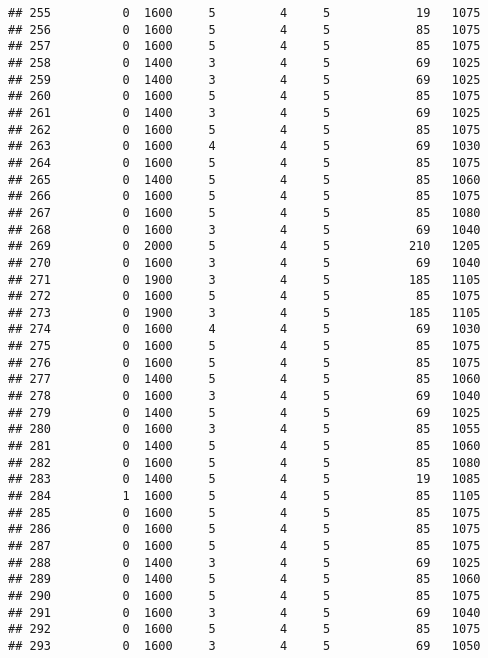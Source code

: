 \documentclass[]{article}
\begin{document}
\begin{verbatim}
## 255          0  1600     5         4     5            19   1075
## 256          0  1600     5         4     5            85   1075
## 257          0  1600     5         4     5            85   1075
## 258          0  1400     3         4     5            69   1025
## 259          0  1400     3         4     5            69   1025
## 260          0  1600     5         4     5            85   1075
## 261          0  1400     3         4     5            69   1025
## 262          0  1600     5         4     5            85   1075
## 263          0  1600     4         4     5            69   1030
## 264          0  1600     5         4     5            85   1075
## 265          0  1400     5         4     5            85   1060
## 266          0  1600     5         4     5            85   1075
## 267          0  1600     5         4     5            85   1080
## 268          0  1600     3         4     5            69   1040
## 269          0  2000     5         4     5           210   1205
## 270          0  1600     3         4     5            69   1040
## 271          0  1900     3         4     5           185   1105
## 272          0  1600     5         4     5            85   1075
## 273          0  1900     3         4     5           185   1105
## 274          0  1600     4         4     5            69   1030
## 275          0  1600     5         4     5            85   1075
## 276          0  1600     5         4     5            85   1075
## 277          0  1400     5         4     5            85   1060
## 278          0  1600     3         4     5            69   1040
## 279          0  1400     5         4     5            69   1025
## 280          0  1600     3         4     5            85   1055
## 281          0  1400     5         4     5            85   1060
## 282          0  1600     5         4     5            85   1080
## 283          0  1400     5         4     5            19   1085
## 284          1  1600     5         4     5            85   1105
## 285          0  1600     5         4     5            85   1075
## 286          0  1600     5         4     5            85   1075
## 287          0  1600     5         4     5            85   1075
## 288          0  1400     3         4     5            69   1025
## 289          0  1400     5         4     5            85   1060
## 290          0  1600     5         4     5            85   1075
## 291          0  1600     3         4     5            69   1040
## 292          0  1600     5         4     5            85   1075
## 293          0  1600     3         4     5            69   1050

\end{verbatim}
\end{document}
